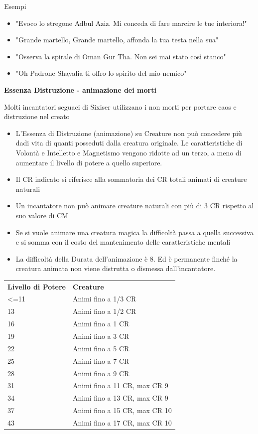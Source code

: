 \documentclass[a4paper,11pt,twoside,openany]{book}
\begin{document}
\bigskip

Esempi
\begin{itemize}
	\item
	      "Evoco lo stregone Adbul Aziz. Mi conceda di fare marcire le tue interiora!"
	\item
	      "Grande martello, Grande martello, affonda la tua testa nella sua"
	\item
	      "Osserva la spirale di Oman Gur Tha. Non sei mai stato così stanco"
	\item
	      "Oh Padrone Shayalia ti offro lo spirito del mio nemico"
\end{itemize}

\bigskip

\textbf{Essenza Distruzione - animazione dei morti}

Molti incantatori seguaci di Sixiser utilizzano i non morti per portare caos e distruzione nel creato

\begin{itemize}
	\item
	      L'Essenza di Distruzione (animazione) su Creature non può concedere più dadi vita di quanti posseduti dalla creatura originale. Le caratteristiche di Volontà e Intelletto e Magnetismo vengono ridotte ad un terzo, a meno di aumentare il livello di potere a quello superiore.
	\item
	      Il CR indicato si riferisce alla sommatoria dei CR totali animati di creature naturali
	\item
	      Un incantatore non può animare creature naturali con più di 3 CR rispetto al suo valore di CM
	\item
	      Se si vuole animare una creatura magica la difficoltà passa a quella successiva e si somma con il costo del mantenimento delle caratteristiche mentali
	\item
	      La difficoltà della Durata dell'animazione è 8. Ed è permanente finché la creatura animata non viene distrutta o dismessa dall'incantatore.
\end{itemize}

\bigskip

\begin{tabularx}{\textwidth}{lX}
	\toprule
	\textbf{Livello di Potere} & \textbf{Creature}\tabularnewline
	\textless=11               & Animi fino a 1/3 CR\tabularnewline
	13                         & Animi fino a 1/2 CR\tabularnewline
	16                         & Animi fino a 1 CR\tabularnewline
	19                         & Animi fino a 3 CR\tabularnewline
	22                         & Animi fino a 5 CR\tabularnewline
	25                         & Animi fino a 7 CR\tabularnewline
	28                         & Animi fino a 9 CR\tabularnewline
	31                         & Animi fino a 11 CR, max CR 9\tabularnewline
	34                         & Animi fino a 13 CR, max CR 9\tabularnewline
	37                         & Animi fino a 15 CR, max CR 10\tabularnewline
	43                         & Animi fino a 17 CR, max CR 10\tabularnewline
\end{tabularx}
\end{document}
